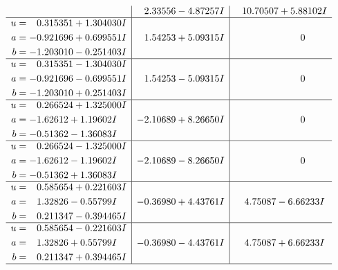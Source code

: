 \documentclass[1p]{elsarticle_modified}
\theoremstyle{definition}
\begin{document}
$$\begin{array}{c|c|c}
 & \phantom{-}2.33556 - 4.87257 I & \phantom{-}10.70507 + 5.88102 I \\ \hline\begin{aligned}
u &= \phantom{-}0.315351 + 1.304030 I \\
a &= -0.921696 + 0.699551 I \\
b &= -1.203010 - 0.251403 I\end{aligned}
 & \phantom{-}1.54253 + 5.09315 I & \phantom{-0.000000 } 0 \\ \hline\begin{aligned}
u &= \phantom{-}0.315351 - 1.304030 I \\
a &= -0.921696 - 0.699551 I \\
b &= -1.203010 + 0.251403 I\end{aligned}
 & \phantom{-}1.54253 - 5.09315 I & \phantom{-0.000000 } 0 \\ \hline\begin{aligned}
u &= \phantom{-}0.266524 + 1.325000 I \\
a &= -1.62612 + 1.19602 I \\
b &= -0.51362 - 1.36083 I\end{aligned}
 & -2.10689 + 8.26650 I & \phantom{-0.000000 } 0 \\ \hline\begin{aligned}
u &= \phantom{-}0.266524 - 1.325000 I \\
a &= -1.62612 - 1.19602 I \\
b &= -0.51362 + 1.36083 I\end{aligned}
 & -2.10689 - 8.26650 I & \phantom{-0.000000 } 0 \\ \hline\begin{aligned}
u &= \phantom{-}0.585654 + 0.221603 I \\
a &= \phantom{-}1.32826 - 0.55799 I \\
b &= \phantom{-}0.211347 - 0.394465 I\end{aligned}
 & -0.36980 + 4.43761 I & \phantom{-}4.75087 - 6.66233 I \\ \hline\begin{aligned}
u &= \phantom{-}0.585654 - 0.221603 I \\
a &= \phantom{-}1.32826 + 0.55799 I \\
b &= \phantom{-}0.211347 + 0.394465 I\end{aligned}
 & -0.36980 - 4.43761 I & \phantom{-}4.75087 + 6.66233 I\\
 \hline 
 \end{array}$$\newpage$$\begin{array}{c|c|c}  

\end{array}$$
\end{document}

